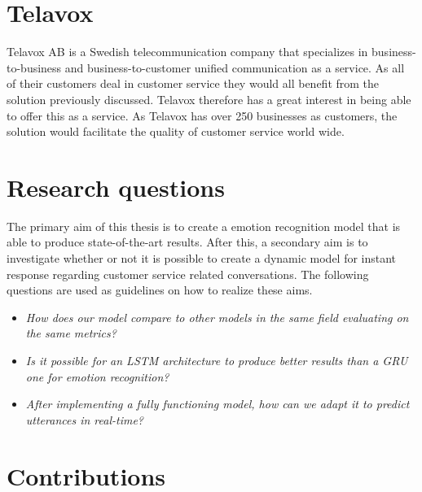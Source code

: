 \documentclass[nofilelist]{cslthse-msc}
\begin{document}
\section{Telavox}
Telavox AB is a Swedish telecommunication company that specializes in business-to-business and business-to-customer unified communication as a service. As all of their customers deal in customer service they would all benefit from the solution previously discussed. Telavox therefore has a great interest in being able to offer this as a service. As Telavox has over 250 businesses as customers, the solution would facilitate the quality of customer service world wide.





\section{Research questions}
The primary aim of this thesis is to create a emotion recognition model that is able to produce state-of-the-art results. After this, a secondary aim is to investigate whether or not it is possible to create a dynamic model for instant response regarding customer service related conversations. The following questions are used as guidelines on how to realize these aims.  

\begin{itemize}
    \item \textit{How does our model compare to other models in the same field evaluating on the same metrics?}
    \item \textit{Is it possible for an LSTM architecture to produce better results than a GRU one for emotion recognition?}
    \item \textit{After implementing a fully functioning model, how can we adapt it to predict utterances in real-time?}
\end{itemize}







\section{Contributions}
\end{document}
